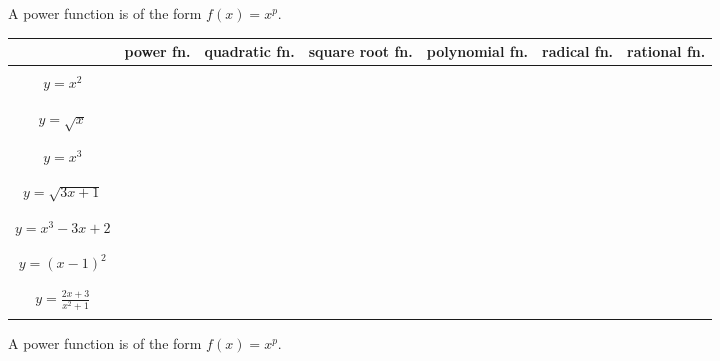 \documentclass{article}
\begin{document}
A power function is of the form $f(x) = x^p$.\\

\begin{tabular}{| c | c | c | c | c | c | c |}
\hline
 & power fn. & quadratic fn. & square root fn. & polynomial fn. & radical fn. & rational fn. \\
\hline
& & & & & &\\
$y=x^2$ & & & & & &\\
& & & & & &\\
\hline
& & & & & &\\
$y=\sqrt{x}$ & & & & & &\\
& & & & & &\\
\hline
& & & & & &\\
$y=x^3$ & & & & & &\\
& & & & & &\\
\hline
& & & & & &\\
$y=\sqrt{3x+1}$ & & & & & &\\
& & & & & &\\
\hline 
& & & & & &\\
$y=x^3 - 3x + 2$ & & & & & &\\
& & & & & &\\
\hline 
& & & & & &\\
$y=(x-1)^2$ & & & & & &\\
& & & & & &\\
\hline 
& & & & & &\\
$y=\frac{2x+3}{x^2+1}$ & & & & & &\\
& & & & & &\\
\hline 
\end{tabular}


\vspace{1.0in}


A power function is of the form $f(x) = x^p$.\\
\end{document}
